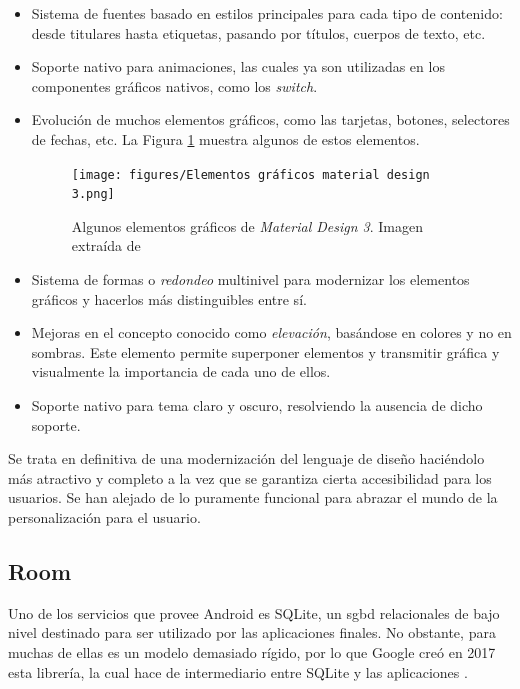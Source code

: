 \begin{itemize}
            \item Sistema de fuentes basado en estilos principales para cada tipo de contenido: desde titulares hasta etiquetas, pasando por títulos, cuerpos de texto, etc.
            \item Soporte nativo para animaciones, las cuales ya son utilizadas en los componentes gráficos nativos, como los \textit{switch}.
            \item Evolución de muchos elementos gráficos, como las tarjetas, botones, selectores de fechas, etc. La Figura \ref{figure:material_design_3:elementos_graficos} muestra algunos de estos elementos.
                \begin{figure}[h]
                    \centering
                    \texttt{[image: figures/Elementos gráficos material design 3.png]}
                    \caption[Algunos elementos gráficos de \textit{Material Design 3}]
                    {Algunos elementos gráficos de \textit{Material Design 3}. Imagen extraída de \cite{cerda_material_2022}}
                    \label{figure:material_design_3:elementos_graficos}
                \end{figure}
            \item Sistema de formas o \textit{redondeo} multinivel para modernizar los elementos gráficos y hacerlos más distinguibles entre sí.
            \item Mejoras en el concepto conocido como \textit{elevación}, basándose en colores y no en sombras. Este elemento permite superponer elementos y transmitir gráfica y visualmente la importancia de cada uno de ellos.
            \item Soporte nativo para tema claro y oscuro, resolviendo la ausencia de dicho soporte.
        \end{itemize}

        Se trata en definitiva de una modernización del lenguaje de diseño haciéndolo más atractivo y completo a la vez que se garantiza cierta accesibilidad para los usuarios. Se han alejado de lo puramente funcional para abrazar el mundo de la personalización para el usuario.

    \subsection{Room}
        Uno de los servicios que provee Android es SQLite, un \gls{sgbd} relacionales de bajo nivel destinado para ser utilizado por las aplicaciones finales. No obstante, para muchas de ellas es un modelo demasiado rígido, por lo que Google creó en 2017 esta librería, la cual hace de intermediario entre SQLite y las aplicaciones \cite{leiva_room_2020}. 
        
